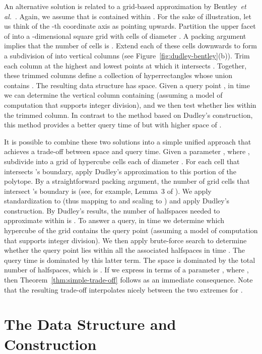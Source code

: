 \documentclass[11pt]{article}   \usepackage[letterpaper,hmargin=2.1cm,vmargin=3cm]{geometry}
\newcommand{\etal}{\textit{et al.}}
\begin{document}
An alternative solution is related to a grid-based approximation by Bentley~{\etal}~\cite{BFP}. Again, we assume that  is contained within . For the sake of illustration, let us think of the -th coordinate axis as pointing upwards. Partition the upper facet of  into a -dimensional square grid with cells of diameter . A packing argument implies that the number of cells is . Extend each of these cells downwards to form a subdivision of  into vertical columns (see Figure~\ref{fig:dudley-bentley}(b)). Trim each column at the highest and lowest points at which it intersects . Together, these trimmed columns define a collection of hyperrectangles whose union contains . The resulting data structure has  space. Given a query point , in  time we can determine the vertical column containing  (assuming a model of computation that supports integer division), and we then test whether  lies within the trimmed column. In contrast to the method based on Dudley's construction, this method provides a better query time of  but with higher space of .

It is possible to combine these two solutions into a simple unified approach that achieves a trade-off between space and query time. Given a parameter , where , subdivide  into a grid of hypercube cells each of diameter . For each cell  that intersects 's boundary, apply Dudley's approximation to this portion of the polytope. By a straightforward packing argument, the number of grid cells that intersect 's boundary is  (see, for example, Lemma~{3} of \cite{ARS}). We apply standardization to  (thus mapping  to  and scaling  to ) and apply Dudley's construction. By Dudley's results, the number of halfspaces needed to approximate  within  is . To answer a query, in  time we determine which hypercube of the grid contains the query point (assuming a model of computation that supports integer division). We then apply brute-force search to determine whether the query point lies within all the associated halfspaces in time . The query time is dominated by this latter term. The space is dominated by the total number of halfspaces, which is . If we express  in terms of a parameter , where , then Theorem~\ref{thm:simple-trade-off} follows as an immediate consequence. Note that the resulting trade-off interpolates nicely between the two extremes for .

\section{The Data Structure and Construction} \label{sec:split-reduce}
\end{document}
